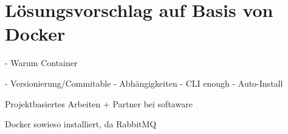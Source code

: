 \chapter{Lösungsvorschlag auf Basis von Docker}
\label{cha:possible-solution}



- Warum Container


- Versionierung/Commitable
- Abhängigkeiten
- CLI enough
- Auto-Install


Projektbasiertes Arbeiten + Partner bei softaware

Docker sowieso installiert, da RabbitMQ
